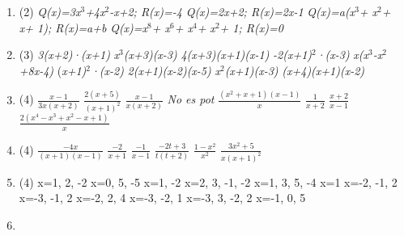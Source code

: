 \begin{enumerate}
 	\item[\clauref{t2-r10}] 
 	\begin{tasks}(2)
 	\task \textit{Q(x)=3x${}^{3}$+4x${}^{2}$-x+2; R(x)=-4}               \task \textit{Q(x)=2x+2;  R(x)=2x-1}         \task \textit{Q(x)=a(x${}^{3}$+ x${}^{2}$+ x+ 1); R(x)=a+b}       \task\textit{ Q(x)=x${}^{8}$+ x${}^{6}$+ x${}^{4}$+ x${}^{2}$+ 1; R(x)=0}
	 \end{tasks}

 	\item[\clauref{t2-r11}] 
 	\begin{tasks}(3)
 	\task \textit{3(x+2)·(x+1)}   \task \textit{x${}^{3}$(x+3)(x-3)}     \task \textit{4(x+3)(x+1)(x-1)}     \task \textit{-2(x+1)${}^{2}$·(x-3)}        \task \textit{x(x${}^{3}$-x${}^{2}$+8x-4)}    \task (\textit{x+1)${}^{2}$·(x-2)}     \task \textit{2(x+1)(x-2)(x-5)}       \task \textit{x${}^{2}$(x+1)(x-3)}         \task \textit{(x+4)(x+1)(x-2)}
 	 \end{tasks}
  
 	\item[\clauref{t2-r13}] 
 	\begin{tasks}(4)
 	\task $\frac{x-1}{3x(x+2)} $  \task $\frac{2(x+5)}{(x+1)^{2} } $   \task  $\frac{x-1}{x(x+2)} $   \task \textit{No es pot}   \task $\frac{(x^{2} +x+1)(x-1)}{x^{} } $           \task $\frac{1}{x+2} $        \task $\frac{x+2}{x-1} $       \task $\frac{2(x^{4} -x^{3} +x^{2} -x+1)}{x} $
 	 \end{tasks}
  
 	\item[\clauref{t2-r12}] 
 	\begin{tasks}(4)
 	\task $\frac{-4x}{(x+1)(x-1)} $  \task $\frac{-2}{x+1} $   \task  $\frac{-1}{x-1} $   \task $\frac{-2t+3}{t(t+2)} $      \task $\frac{1-x^{2} }{x^{2} } $  \task $\frac{3x^{2} +5}{x(x+1)^{2} } $
 	 \end{tasks}
 	
 	\item[\clauref{t2-r14}] 
 	\begin{tasks}(4)
 	\task x=1, 2, -2       \task x=0, 5, -5            \task  x=1, -2        \task x=2, 3, -1, -2 \task x=1, 3, 5, -4
 	\task x=1                 \task x=-2, -1, 2            \task x=-3, -1, 2   \task x=-2, 2, 4                   \task x=-3, -2, 1      \task x=-3, 3, -2, 2  \task x=-1, 0, 5
 	 \end{tasks}
  
 	\item[\clauref{t2-r14b}]
 	

\end{enumerate}
